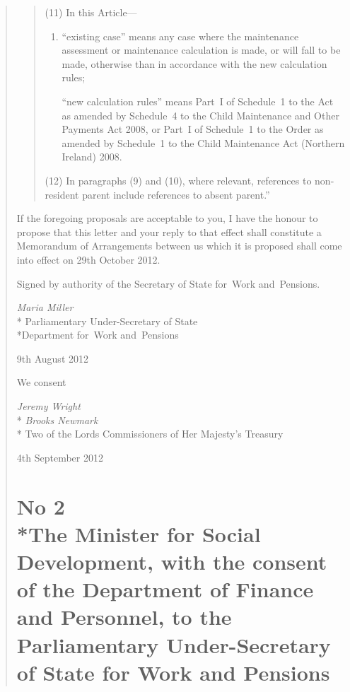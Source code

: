 \documentclass[12pt,a4paper]{article}
\begin{document}
\begin{quotation}
\begin{enumerate}
\begin{quotation}
(11) In this Article---
\begin{enumerate}\item[]
``existing case'' means any case where the maintenance assessment or maintenance calculation is made, or will fall to be made, otherwise than in accordance with the new calculation rules;

``new calculation rules'' means Part~I of Schedule~1 to the Act as amended by Schedule~4 to the Child Maintenance and Other Payments Act 2008, or Part~I of Schedule~1 to the Order as amended by Schedule~1 to the Child Maintenance Act (Northern Ireland) 2008.
\end{enumerate}

(12) In paragraphs (9) and (10), where relevant, references to non-resident parent include references to absent parent.''
\end{quotation}
\end{enumerate}

If the foregoing proposals are acceptable to you, I have the honour to propose that this letter and your reply to that effect shall constitute a Memorandum of Arrangements between us which it is proposed shall come into effect on 29th October 2012.

\bigskip

\pagebreak[3]

Signed 
by authority of the 
Secretary of State for~Work and~Pensions.

{\raggedleft
\emph{Maria Miller}\\*
Parliamentary Under-Secretary 
of State\\*Department 
for~Work and~Pensions

}

9th August 2012

\bigskip

\pagebreak[3]

We consent

{\raggedleft
\emph{Jeremy Wright}\\*
\emph{Brooks Newmark}\\*
Two of the Lords Commissioners of Her Majesty's Treasury

}

4th September 2012

\vfill\eject

\section*{No 2\\*The Minister for Social Development, with the consent of the Department of Finance and Personnel, to the Parliamentary Under-Secretary of State for Work and Pensions}


\end{quotation}
\end{document}
